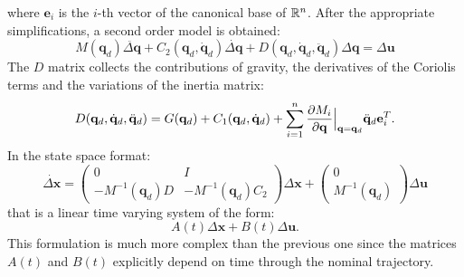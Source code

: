 \documentclass[10pt, a4paper]{report}
\newcommand{\q}{{\mathbf q}}
\begin{document}
where $\mathbf e_i$ is the $i$-th vector of the canonical base of ${\mathbb R}^n$. After the appropriate simplifications, a second order model is obtained:\begin{equation}
    M(\q_d)\ddot{\Delta \q} + C_2(\q_d, \dot{\q}_d)\dot{\Delta \q} + D(\q_d, \dot{\q}_d, \ddot{\q}_d)\Delta \q = \Delta \mathbf u
\end{equation}
The $D$ matrix collects the contributions of gravity, the derivatives of the Coriolis terms and the variations of the inertia matrix:\begin{equation}
    D(\q_d, \dot{\q}_d, \ddot{\q}_d) = G(\q_d) + C_1(\q_d,\dq_d) + \sum_{i=1}^{n} \frac{\partial M_i}{\partial \q}\Big|_{\q=\q_d} \ddot{\q}_d \mathbf e_i^T.
\end{equation}
In the state space format:\begin{equation}
    \dot{\Delta \mathbf x} = \begin{pmatrix} 0 & I \\ -M^{-1}(\q_d)D & -M^{-1}(\q_d)C_2 \end{pmatrix} \Delta \mathbf x + \begin{pmatrix} 0 \\ M^{-1}(\q_d) \end{pmatrix} \Delta \mathbf u
\end{equation} 
that is a linear time varying system of the form:\begin{equation}
    A(t)\Delta\mathbf x + B(t)\Delta \mathbf u.
\end{equation}
This formulation is much more complex than the previous one since the matrices $A(t)$ and $B(t)$ explicitly depend on time through the nominal trajectory. 
\end{document}
